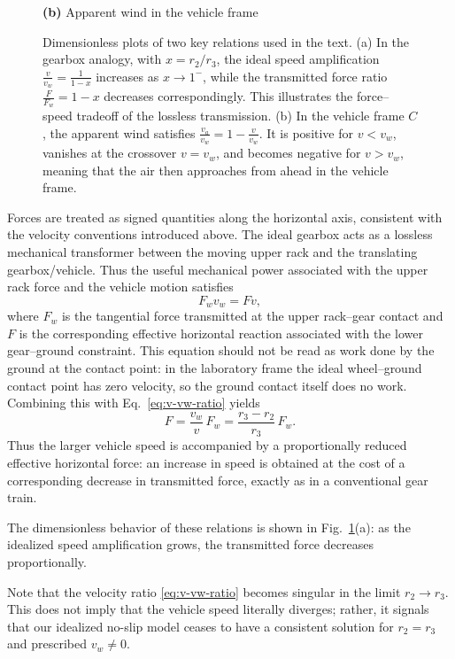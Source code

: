 \documentclass[reprint,aps,pra,longbibliography]{revtex4-2}
\begin{document}
\begin{figure}[t]
\begin{minipage}{0.48\textwidth}
\vspace{1mm}
\textbf{(b)} Apparent wind in the vehicle frame
\end{minipage}

\caption{Dimensionless plots of two key relations used in the text.
(a) In the gearbox analogy, with $x=r_2/r_3$, the ideal speed amplification
$\frac{v}{v_w}=\frac{1}{1-x}$ increases as $x\to1^{-}$, while the transmitted
force ratio $\frac{F}{F_w}=1-x$ decreases correspondingly. This illustrates
the force--speed tradeoff of the lossless transmission.
(b) In the vehicle frame \(C\), the apparent wind satisfies
$\frac{v_a}{v_w}=1-\frac{v}{v_w}$. It is positive for $v<v_w$, vanishes at the
crossover $v=v_w$, and becomes negative for $v>v_w$, meaning that the air then
approaches from ahead in the vehicle frame.}
\label{fig:dimensionless_plots}
\end{figure}

Forces are treated as signed quantities along the horizontal axis,
consistent with the velocity conventions introduced above.  The ideal gearbox
acts as a lossless mechanical transformer between the moving upper rack and
the translating gearbox/vehicle.  Thus the useful mechanical power associated
with the upper rack force and the vehicle motion satisfies
\[
F_w v_w = F v ,
\]
where \(F_w\) is the tangential force transmitted at the upper rack--gear
contact and \(F\) is the corresponding effective horizontal reaction associated
with the lower gear--ground constraint.  This equation should not be read as
work done by the ground at the contact point: in the laboratory frame the
ideal wheel--ground contact point has zero velocity, so the ground contact
itself does no work.
Combining this with Eq.~\eqref{eq:v-vw-ratio} yields
\begin{equation}
F = \frac{v_w}{v} \,  F_w
    = \frac{r_3 - r_2}{r_3}\, F_w.
\end{equation}
Thus the larger vehicle speed is accompanied by a proportionally reduced
effective horizontal force: an increase in speed is obtained at the cost of a
corresponding decrease in transmitted force, exactly as in a conventional gear
train.

The dimensionless behavior of these relations is shown in Fig.~\ref{fig:dimensionless_plots}(a): as the idealized speed amplification grows, the transmitted force decreases proportionally.

Note that the velocity ratio \eqref{eq:v-vw-ratio}
becomes singular in the limit $r_2 \to r_3$. This does not imply that the
vehicle speed literally diverges; rather, it signals that our idealized
no-slip model ceases to have a consistent solution for $r_2 = r_3$ and
prescribed $v_w \neq 0$.
\end{document}
